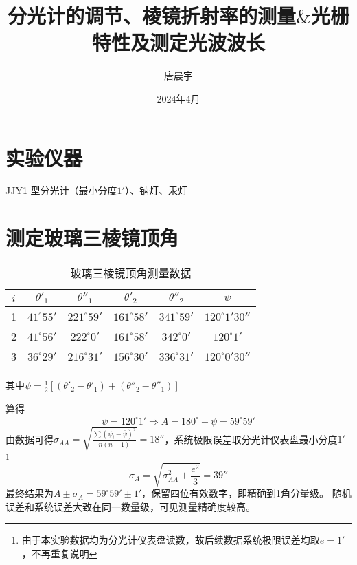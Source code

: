 \documentclass[12pt, a4paper]{ctexart}
\begin{document}
\title{分光计的调节、棱镜折射率的测量$\&$光栅特性及测定光波波长}
\author{唐晨宇 }
\date{2024年4月}

\maketitle

\tableofcontents
{}

\clearpage

\section*{实验仪器}
JJY1 型分光计（最小分度$1'$）、钠灯、汞灯

\section{测定玻璃三棱镜顶角}

\begin{table}[htbp]
  \centering
  \caption{玻璃三棱镜顶角测量数据}
    \begin{tabular}{cccccc}
    \toprule
    $i$ & $\theta'_1$ & $\theta''_1$ & $\theta'_2$ & $\theta''_2$ &$\psi$ \\
    \midrule
    1     & $41^{\circ}55'$ & $221^{\circ}59'$ & $161^{\circ}58'$ & $341^{\circ}59'$ & $120^{\circ}1'30''$ \\
    2     & $41^{\circ}56'$ & $222^{\circ}0'$  & $161^{\circ}58'$ & $342^{\circ}0'$  & $120^{\circ}1'$     \\
    3     & $36^{\circ}29'$ & $216^{\circ}31'$ & $156^{\circ}30'$ & $336^{\circ}31'$ & $120^{\circ}0'30''$ \\
    \bottomrule
    \end{tabular}
  \label{tab:t1}
\end{table}
其中$\psi = \frac12 [(\theta'_2 - \theta'_1) + (\theta''_2 - \theta''_1)]$

算得
\[ \bar{\psi} = 120^{\circ}1' \Rightarrow A = 180^{\circ} - \bar{\psi} =  59^{\circ}59' \]
由数据可得$\sigma_{AA} = \sqrt{\frac{\sum(\psi_i - \bar{\psi})^2}{n(n-1)}} = 18''$，系统极限误差取分光计仪表盘最小分度$1'$
\footnote{由于本实验数据均为分光计仪表盘读数，故后续数据系统极限误差均取$e = 1'$，不再重复说明}
\[ \sigma_A = \sqrt{\sigma_{AA}^2 + \frac{e^2}{3}} = 39'' \]
最终结果为$ A \pm \sigma_A = 59^{\circ}59' \pm 1' $，保留四位有效数字，即精确到1角分量级。
随机误差和系统误差大致在同一数量级，可见测量精确度较高。
\end{document}
